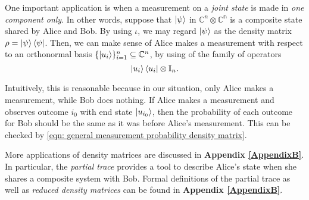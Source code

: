 One important application is when a measurement on a {\emph{joint state}} is made in {\emph{one component only}}.  In other words, suppose that $\ket{\psi}$ in $\mathbb{C}^n \otimes \mathbb{C^n}$ is a composite state shared by Alice and Bob.  By using $\iota$, we may regard $\ket{\psi}$ as the density matrix $\rho=\ket{\psi}\bra{\psi}$.  Then, we can make sense of Alice makes a measurement with respect to an orthonormal basis $\{\ket{u_i}\}_{i=1}^n\subseteq {\mathbb{C}}^n$, by using of the family of operators $$\ket{u_i}\bra{u_i} \otimes \mathbb{I}_n.$$ 

Intuitively, this is reasonable because in our situation, only Alice makes a measurement, while Bob does nothing.  If Alice makes a measurement and observes outcome $i_0$ with end state $\ket{u_{i_0}}$, then the probability of each outcome for Bob should be the same as it was before Alice's measurement.  This can be checked by \eqref{eqn: general measurement probability density matrix}.

More applications of density matrices are discussed in \textbf{Appendix \ref{AppendixB}}.  In particular, the  \textit{partial trace} provides a tool to describe Alice's state when she shares a composite system with Bob.  Formal definitions of the partial trace as well as \textit{reduced density matrices} can be found in \textbf{Appendix \ref{AppendixB}}.




